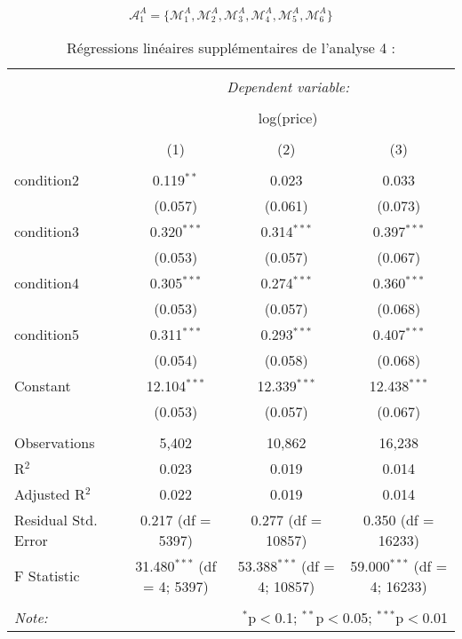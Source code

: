 \documentclass[
  11pt,
  french,
]{article}
\begin{document}
\newpage

\[\mathcal{A}_{1}^{A}=\{\mathcal{M}_{1}^{A},\mathcal{M}_{2}^{A},\mathcal{M}_{3}^{A},\mathcal{M}_{4}^{A},\mathcal{M}_{5}^{A},\mathcal{M}_{6}^{A}\}\]

\begin{table}[!htbp] \centering 
  \caption{Régressions linéaires supplémentaires de l'analyse 4 :} 
  \label{} 
\small 
\begin{tabular}{@{\extracolsep{1pt}}lccc} 
\\[-1.8ex]\hline 
\hline \\[-1.8ex] 
 & \multicolumn{3}{c}{\textit{Dependent variable:}} \\ 
\cline{2-4} 
\\[-1.8ex] & \multicolumn{3}{c}{log(price)} \\ 
\\[-1.8ex] & (1) & (2) & (3)\\ 
\hline \\[-1.8ex] 
 condition2 & 0.119$^{**}$ & 0.023 & 0.033 \\ 
  & (0.057) & (0.061) & (0.073) \\ 
  condition3 & 0.320$^{***}$ & 0.314$^{***}$ & 0.397$^{***}$ \\ 
  & (0.053) & (0.057) & (0.067) \\ 
  condition4 & 0.305$^{***}$ & 0.274$^{***}$ & 0.360$^{***}$ \\ 
  & (0.053) & (0.057) & (0.068) \\ 
  condition5 & 0.311$^{***}$ & 0.293$^{***}$ & 0.407$^{***}$ \\ 
  & (0.054) & (0.058) & (0.068) \\ 
  Constant & 12.104$^{***}$ & 12.339$^{***}$ & 12.438$^{***}$ \\ 
  & (0.053) & (0.057) & (0.067) \\ 
 \hline \\[-1.8ex] 
Observations & 5,402 & 10,862 & 16,238 \\ 
R$^{2}$ & 0.023 & 0.019 & 0.014 \\ 
Adjusted R$^{2}$ & 0.022 & 0.019 & 0.014 \\ 
Residual Std. Error & 0.217 (df = 5397) & 0.277 (df = 10857) & 0.350 (df = 16233) \\ 
F Statistic & 31.480$^{***}$ (df = 4; 5397) & 53.388$^{***}$ (df = 4; 10857) & 59.000$^{***}$ (df = 4; 16233) \\ 
\hline 
\hline \\[-1.8ex] 
\textit{Note:}  & \multicolumn{3}{r}{$^{*}$p$<$0.1; $^{**}$p$<$0.05; $^{***}$p$<$0.01} \\ 
\end{tabular} 
\end{table}
\end{document}
